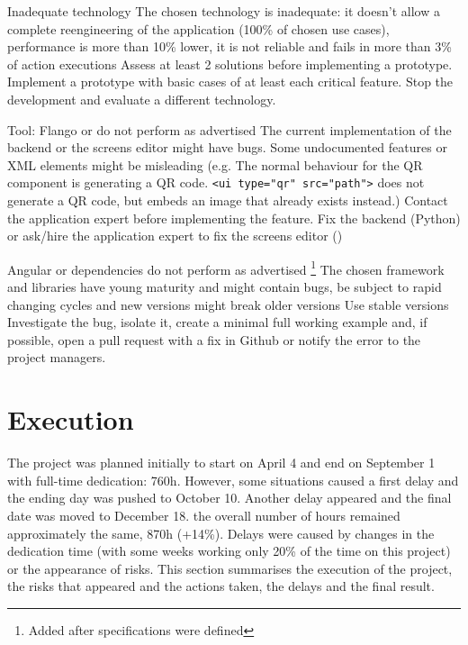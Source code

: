 \begin{risk}
{Inadequate technology}
{The chosen technology is inadequate: it doesn't allow a complete reengineering of the application (100\% of chosen use cases), performance is more than 10\% lower, it is not reliable and fails in more than 3\% of action executions}
{Assess at least 2 solutions before implementing a prototype. Implement a prototype with basic cases of at least each critical feature.}
{Stop the development and evaluate a different technology.}
\end{risk}

\begin{risk}
{Tool: Flango or \se do not perform as advertised}
{The current implementation of the backend or the screens editor might have bugs.
Some undocumented features or \ac{XML} elements might be misleading (e.g. The normal behaviour for the QR component is generating a QR code. \lstinline$<ui type="qr" src="path">$ does not generate a QR code, but embeds an image that already exists instead.) }
{Contact the application expert before implementing the feature.}
{Fix the backend (Python) or ask/hire the application expert to fix the screens editor (\flash)}
\end{risk}

\begin{risk}
{Angular or dependencies do not perform as advertised \footnote{Added after specifications were defined}}
{The chosen framework and libraries have young maturity and might contain bugs, be subject to rapid changing cycles and new versions might break older versions}
{Use stable versions}
{Investigate the bug, isolate it, create a minimal full working example and, if possible, open a pull request with a fix in Github or notify the error to the project managers.}
\end{risk}

\FloatBarrier

\section{Execution}
The project was planned initially to start on April 4 and end on September 1 with full-time dedication: 760h.
However, some situations caused a first delay and the ending day was pushed to October 10.
Another delay appeared and the final date was moved to December 18.
the overall number of hours remained approximately the same, 870h (+14\%).
Delays were caused by changes in the dedication time (with some weeks working only 20\% of the time on this project) or the appearance of risks.
This section summarises the execution of the project, the risks that appeared and the actions taken, the delays and the final result.

